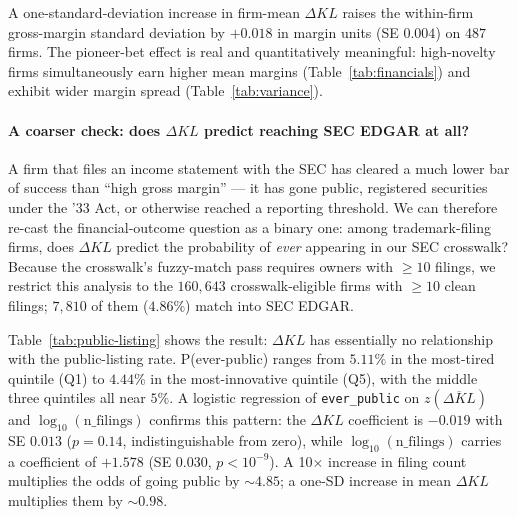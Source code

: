 \documentclass[11pt]{article}
\begin{document}
\begin{table}[h]
\centering
\caption{Variance regression: within-firm std.\ of gross margin on
firm-mean novelty.}
\label{tab:variance}

\end{table}

A one-standard-deviation increase in firm-mean $\Delta KL$ raises the
within-firm gross-margin standard deviation by $+0.018$ in margin units
(SE $0.004$) on $487$ firms. The pioneer-bet effect is real and
quantitatively meaningful: high-novelty firms simultaneously earn
higher mean margins (Table~\ref{tab:financials}) and exhibit wider
margin spread (Table~\ref{tab:variance}).

\paragraph{A coarser check: does $\Delta KL$ predict reaching SEC EDGAR
at all?}
A firm that files an income statement with the SEC has cleared a
much lower bar of success than ``high gross margin'' --- it has gone
public, registered securities under the '33 Act, or otherwise reached a
reporting threshold. We can therefore re-cast the financial-outcome
question as a binary one: among trademark-filing firms, does $\Delta KL$
predict the probability of \emph{ever} appearing in our SEC crosswalk?
Because the crosswalk's fuzzy-match pass requires owners with
$\geq 10$ filings, we restrict this analysis to the
$160{,}643$ crosswalk-eligible firms with $\geq 10$ clean filings;
$7{,}810$ of them ($4.86\%$) match into SEC EDGAR.

Table~\ref{tab:public-listing} shows the result: $\Delta KL$ has
essentially no relationship with the public-listing rate.
P(ever-public) ranges from $5.11\%$ in the most-tired quintile (Q1) to
$4.44\%$ in the most-innovative quintile (Q5), with the middle three
quintiles all near $5\%$. A logistic regression of \texttt{ever\_public}
on $z(\overline{\Delta KL})$ and $\log_{10}(\text{n\_filings})$ confirms
this pattern: the $\Delta KL$ coefficient is $-0.019$ with SE $0.013$
($p = 0.14$, indistinguishable from zero), while
$\log_{10}(\text{n\_filings})$ carries a coefficient of $+1.578$
(SE $0.030$, $p < 10^{-9}$). A 10$\times$ increase in filing count
multiplies the odds of going public by $\sim$$4.85$; a one-SD increase
in mean $\Delta KL$ multiplies them by $\sim$$0.98$.

\begin{table}[h]
\centering
\caption{P(ever-public) by mean-$\Delta KL$ quintile, on the
$160{,}643$ firms with $\geq 10$ clean filings. The relationship is
essentially flat: novelty does not predict reaching the SEC reporting
universe; filing volume does.}
\label{tab:public-listing}

\end{table}
\end{document}
